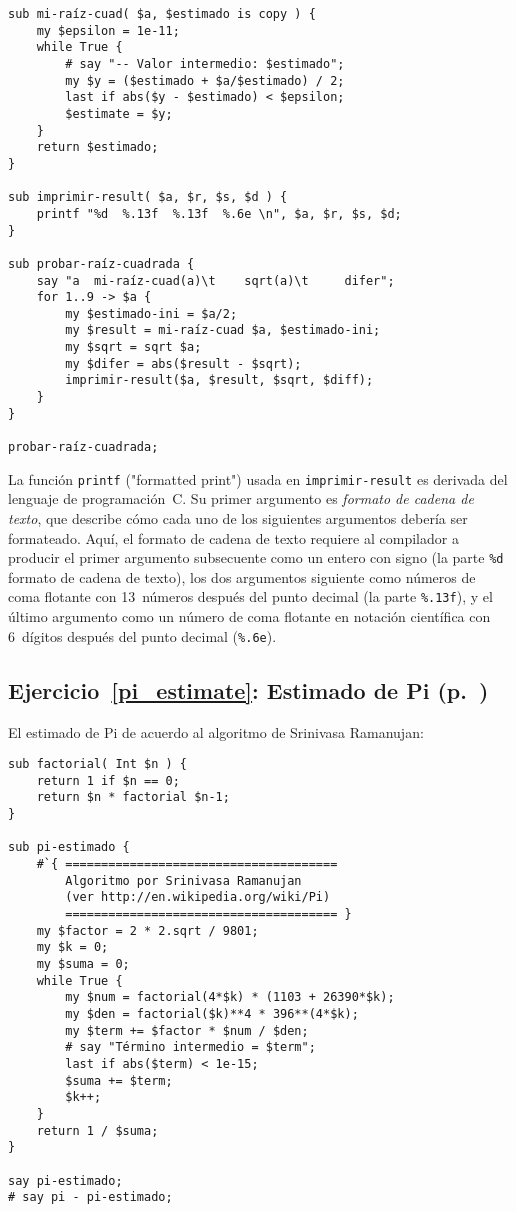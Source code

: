 \begin{verbatim}
sub mi-raíz-cuad( $a, $estimado is copy ) {
    my $epsilon = 1e-11;
    while True {
        # say "-- Valor intermedio: $estimado";
        my $y = ($estimado + $a/$estimado) / 2;
        last if abs($y - $estimado) < $epsilon;
        $estimate = $y;
    }
    return $estimado;
}

sub imprimir-result( $a, $r, $s, $d ) {
    printf "%d  %.13f  %.13f  %.6e \n", $a, $r, $s, $d;
}

sub probar-raíz-cuadrada {
    say "a  mi-raíz-cuad(a)\t    sqrt(a)\t     difer";
    for 1..9 -> $a {
        my $estimado-ini = $a/2;
        my $result = mi-raíz-cuad $a, $estimado-ini;
        my $sqrt = sqrt $a;
        my $difer = abs($result - $sqrt);
        imprimir-result($a, $result, $sqrt, $diff);
    }
}
    
probar-raíz-cuadrada;
\end{verbatim}

La función {\tt printf} ("formatted print") usada en {\tt imprimir-result}
es derivada del lenguaje de programación~C. Su primer argumento
es \emph{formato de cadena de texto}, que describe cómo cada uno de
los siguientes argumentos debería ser formateado. Aquí, el 
formato de cadena de texto requiere al compilador a producir
el primer argumento subsecuente como un entero con signo (la parte \verb|%d|
formato de cadena de texto), los dos argumentos siguiente como
números de coma flotante con 13~números después del punto decimal
(la parte \verb|%.13f|), y el último argumento como
un número de coma flotante en notación científica con 
6~dígitos después del punto decimal (\verb|%.6e|).



\subsection{Ejercicio~\ref{pi_estimate}: Estimado de Pi (p.~\pageref{pi_estimate})}
\label{sol_pi_estimate}

El estimado de Pi de acuerdo al algoritmo
de Srinivasa Ramanujan:

\begin{verbatim}
sub factorial( Int $n ) {
    return 1 if $n == 0;
    return $n * factorial $n-1;
}

sub pi-estimado {
    #`{ ======================================
        Algoritmo por Srinivasa Ramanujan 
        (ver http://en.wikipedia.org/wiki/Pi)
        ====================================== }
    my $factor = 2 * 2.sqrt / 9801;
    my $k = 0;
    my $suma = 0;
    while True {
        my $num = factorial(4*$k) * (1103 + 26390*$k);
        my $den = factorial($k)**4 * 396**(4*$k);
        my $term += $factor * $num / $den;
        # say "Término intermedio = $term";
        last if abs($term) < 1e-15;
        $suma += $term;
        $k++;
    }
    return 1 / $suma;
}

say pi-estimado;
# say pi - pi-estimado;
\end{verbatim}

